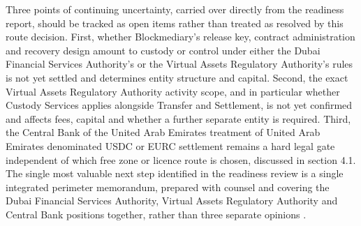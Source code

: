 \documentclass[12pt, a4paper]{article}
\begin{document}
Three points of continuing uncertainty, carried over directly from the readiness report,
should be tracked as open items rather than treated as resolved by this route decision.
First, whether Blockmediary's release key, contract administration and recovery design
amount to custody or control under either the Dubai Financial Services Authority's or the
Virtual Assets Regulatory Authority's rules is not yet settled and determines entity
structure and capital. Second, the exact Virtual Assets Regulatory Authority activity
scope, and in particular whether Custody Services applies alongside Transfer and
Settlement, is not yet confirmed and affects fees, capital and whether a further separate
entity is required. Third, the Central Bank of the United Arab Emirates treatment of
United Arab Emirates denominated USDC or EURC settlement remains a hard legal gate
independent of which free zone or licence route is chosen, discussed in section 4.1. The
single most valuable next step identified in the readiness review is a single integrated
perimeter memorandum, prepared with counsel and covering the Dubai Financial Services
Authority, Virtual Assets Regulatory Authority and Central Bank positions together, rather
than three separate opinions \citep{difcvarareport2026}.

\newpage


\end{document}
